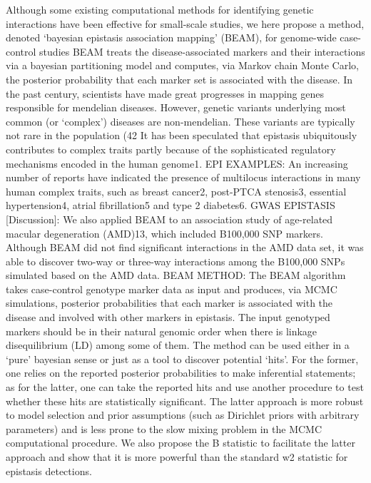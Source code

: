 Although some existing computational methods for identifying genetic interactions have been effective for small-scale studies, we here propose a method, denoted `bayesian epistasis association mapping' (BEAM), for genome-wide case-control studies \cite{zhang2007bayesian}
BEAM treats the disease-associated markers and their interactions via a bayesian partitioning model and computes, via Markov chain Monte Carlo, the posterior probability that each marker set is associated with the disease.  \cite{zhang2007bayesian}
In the past century, scientists have made great progresses in mapping genes responsible for mendelian diseases. However, genetic variants underlying most common (or `complex') diseases are non-mendelian. \cite{zhang2007bayesian}
These variants are typically not rare in the population (42%
It has been speculated that epistasis ubiquitously contributes to complex traits partly because of the sophisticated regulatory mechanisms encoded in the human genome1.  \cite{zhang2007bayesian}
EPI EXAMPLES: An increasing number of reports have indicated the presence of multilocus interactions in many human complex traits, such as breast cancer2, post-PTCA stenosis3, essential hypertension4, atrial fibrillation5 and type 2 diabetes6. \cite{zhang2007bayesian}
GWAS EPISTASIS [Discussion]: We also applied BEAM to an association study of age-related macular degeneration (AMD)13, which included B100,000 SNP markers. Although BEAM did not find significant interactions in the AMD data set, it was able to discover two-way or three-way interactions among the B100,000 SNPs simulated based on the AMD data. \cite{zhang2007bayesian}
BEAM METHOD:
	The BEAM algorithm takes case-control genotype marker data as input and produces, via MCMC simulations, posterior probabilities that each marker is associated with the disease and involved with other markers in epistasis.  \cite{zhang2007bayesian}
	The input genotyped markers should be in their natural genomic order when there is linkage disequilibrium (LD) among some of them. The method can be used either in a `pure' bayesian sense or just as a tool to discover potential `hits'. For the former, one relies on the reported posterior probabilities to make inferential statements; as for the latter, one can take the reported hits and use another procedure to test whether these hits are statistically significant.  \cite{zhang2007bayesian}
	The latter approach is more robust to model selection and prior assumptions (such as Dirichlet priors with arbitrary parameters) and is less prone to the slow mixing problem in the MCMC computational procedure. We also propose the B statistic to facilitate the latter approach and show that it is more powerful than the standard w2 statistic for epistasis detections. \cite{zhang2007bayesian}
